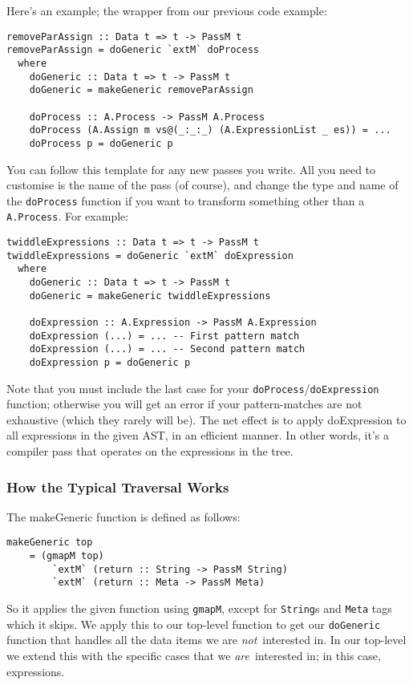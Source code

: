 \documentclass[a4wide]{article}
\begin{document}
Here's an example; the wrapper from our previous code example:

\begin{lstlisting}
removeParAssign :: Data t => t -> PassM t
removeParAssign = doGeneric `extM` doProcess
  where
    doGeneric :: Data t => t -> PassM t
    doGeneric = makeGeneric removeParAssign

    doProcess :: A.Process -> PassM A.Process
    doProcess (A.Assign m vs@(_:_:_) (A.ExpressionList _ es)) = ...
    doProcess p = doGeneric p
\end{lstlisting}

You can follow this template for any new passes you write.  All you need to customise is the
name of the pass (of course), and change the type and name of the \lstinline|doProcess| function if you
want to transform something other than a \lstinline|A.Process|.  For example:

\begin{lstlisting}
twiddleExpressions :: Data t => t -> PassM t
twiddleExpressions = doGeneric `extM` doExpression
  where
    doGeneric :: Data t => t -> PassM t
    doGeneric = makeGeneric twiddleExpressions

    doExpression :: A.Expression -> PassM A.Expression
    doExpression (...) = ... -- First pattern match
    doExpression (...) = ... -- Second pattern match
    doExpression p = doGeneric p
\end{lstlisting}

Note that you must include the last case for your \lstinline|doProcess|/\lstinline|doExpression| function; otherwise you
will get an error if your pattern-matches are not exhaustive (which they rarely will be).
The net effect is to apply doExpression to all expressions in the given AST, in an efficient manner.
In other words, it's a compiler pass that operates on the expressions in the tree.

\subsubsection{How the Typical Traversal Works}

The makeGeneric function is defined as follows:

\begin{lstlisting}
makeGeneric top
    = (gmapM top)
        `extM` (return :: String -> PassM String)
        `extM` (return :: Meta -> PassM Meta)
\end{lstlisting}

So it applies the given function using \lstinline|gmapM|, except for \lstinline|String|s and \lstinline|Meta| tags which
it skips.  We apply this to our top-level function to get our \lstinline|doGeneric| function
that handles all the data items we are \textit{not}~interested in.  In our top-level
we extend this with the specific cases that we \textit{are}~interested in; in this case,
expressions.
\end{document}
